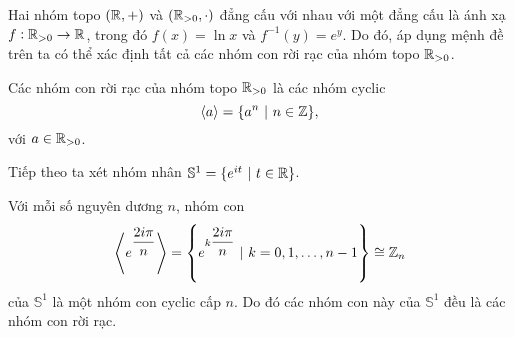 \begin{comment*}
    Hai nhóm topo $(\R,+)$ và $(\R_{>0},\cdot)$ đẳng cấu với nhau với một đẳng cấu là ánh xạ $f: \R_{>0} \to \R$, trong đó $f(x) = \ln{x}$ và $f^{-1}(y) = e^y$. Do đó, áp dụng mệnh đề trên ta có thể xác định tất cả các nhóm con rời rạc của nhóm topo $\R_{>0}$.
\end{comment*}
\begin{cor}\label{cor 3.2.4}
    Các nhóm con rời rạc của nhóm topo $\mathbb{R}_{>0}$ là các nhóm cyclic
    \[\left<a\right> = \{a^n~|~n \in \mathbb{Z}\},\]
    với $a \in \mathbb{R}_{>0}$.
\end{cor}

Tiếp theo ta xét nhóm nhân $\mathbb{S}^1 = \{ e^{it} ~|~t\in \mathbb{R}\}$.

Với mỗi số nguyên dương $n$, nhóm con \[\left<e^{\dfrac{2i\pi}{n}}\right> = \left\{e^{k\dfrac{2i\pi}{n}}~|~k = 0,1,\ldots,n-1\right\} \cong \mathbb{Z}_n\]
của $\mathbb{S}^1$ là một nhóm con cyclic cấp $n$. Do đó các nhóm con này của $\mathbb{S}^1$ đều là các nhóm con rời rạc.

